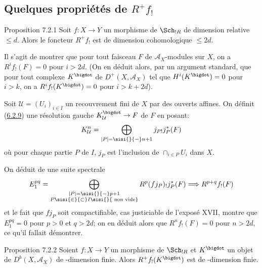 \documentclass[10pt]{../fichiers-configuration-latex/smfart}
\begin{document}
\subsection[Quelques propriétés de $R^{+}f_{!}$]{Quelques propriétés de
  $R^{+}f_{!}$}
\pageoriginale

\begin{enonce*}{Proposition 7.2.1}
Soit $f:X\rightarrow Y$ un morphisme de $\Sch_{!R}$ de dimension
relative $\leq d$. Alors le foncteur $R^{+}f_{!}$ est de dimension
cohomologique $\leq 2d$.
\end{enonce*}

Il s'agit de montrer que pour tout faisceau $F$ de
$\mathcal{A}_{X}$-modules sur $X$, on a $R^{i}f_{!}(F)=0$ pour
$i>2d$. (On en déduit alors, par un argument standard, que pour tout
complexe $K^{\bigdot}$ de $D^{+}(X,\mathcal{A}_{X})$ tel que
$H^{i}(K^{\bigdot})=0$ pour $i>k$, on a $R^{i}f_{!}(K^{\bigdot})=0$
pour $i>k+2d$).

Soit $\mathcal{U}=(U_{i})_{i\in I}$ un recouvrement fini de $X$ par
des ouverts affines. On définit (\hyperref[XVII.prop6.2.9]{6.2.9}) une résolution gauche
$K^{\bigdot}_{\mathcal{U}}\rightarrow F$ de $F$ en posant:
\[
K^{n}_{\mathcal{U}}=\bigoplus_{|P|=\sisi{}{-}n+1} j_{P!}j^{*}_{P}(F)
\]
où pour chaque partie $P$ de $I$, $j_{P}$ est l'inclusion de
$\cap_{i\in P} U_{i}$ dans $X$.

On déduit de  une suite spectrale
\[
E^{pq}_{1}=\bigoplus_{\substack{|P|=\sisi{}{-}p+1\\ P\sisi{\in}{\subset} I\sisi{}{\text{ non vide}}}} R^{p}(fj_{P})_{!}
j^{\ast}_{P}(F)\Longrightarrow R^{p+q}f_{!}(F)
\]
et le fait que $fj_{P}$ soit compactifiable, cas justiciable de
l'exposé XVII, montre que $E^{pq}_{1}=0$ pour $p>0$ et $q>2d$; on en
déduit alors que $R^{n}f_{!}(F)=0$ pour $n>2d$, ce qu'il fallait
démontrer.

\begin{enonce*}{Proposition 7.2.2}
Soient $f:X\rightarrow Y$ un morphisme de $\Sch_{!R}$ et
$K^{\bigdot}$ un objet de $D^{b}(X,\mathcal{A}_{X})$ de \tTor-dimension
finie. Alors $R^{+}f_{!}(K^{\bigdot})$ est de \tTor-dimension finie.
\end{enonce*}
\end{document}
